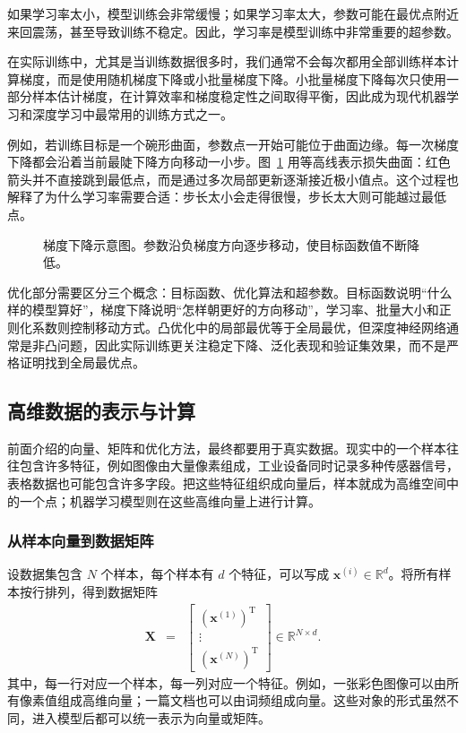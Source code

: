如果学习率太小，模型训练会非常缓慢；如果学习率太大，参数可能在最优点附近来回震荡，甚至导致训练不稳定。因此，学习率是模型训练中非常重要的超参数。

在实际训练中，尤其是当训练数据很多时，我们通常不会每次都用全部训练样本计算梯度，而是使用随机梯度下降或小批量梯度下降。小批量梯度下降每次只使用一部分样本估计梯度，在计算效率和梯度稳定性之间取得平衡，因此成为现代机器学习和深度学习中最常用的训练方式之一。

例如，若训练目标是一个碗形曲面，参数点一开始可能位于曲面边缘。每一次梯度下降都会沿着当前最陡下降方向移动一小步。图~\ref{fig:aml-gradient-descent} 用等高线表示损失曲面：红色箭头并不直接跳到最低点，而是通过多次局部更新逐渐接近极小值点。这个过程也解释了为什么学习率需要合适：步长太小会走得很慢，步长太大则可能越过最低点。

\begin{figure}[htbp]
  \centering
  
  \caption{梯度下降示意图。参数沿负梯度方向逐步移动，使目标函数值不断降低。}
  \label{fig:aml-gradient-descent}
\end{figure}

\begin{importantnote}
  优化部分需要区分三个概念：目标函数、优化算法和超参数。目标函数说明“什么样的模型算好”，梯度下降说明“怎样朝更好的方向移动”，学习率、批量大小和正则化系数则控制移动方式。凸优化中的局部最优等于全局最优，但深度神经网络通常是非凸问题，因此实际训练更关注稳定下降、泛化表现和验证集效果，而不是严格证明找到全局最优点。
\end{importantnote}

\subsection{高维数据的表示与计算}

前面介绍的向量、矩阵和优化方法，最终都要用于真实数据。现实中的一个样本往往包含许多特征，例如图像由大量像素组成，工业设备同时记录多种传感器信号，表格数据也可能包含许多字段。把这些特征组织成向量后，样本就成为高维空间中的一个点；机器学习模型则在这些高维向量上进行计算。

\subsubsection{从样本向量到数据矩阵}

设数据集包含 $N$ 个样本，每个样本有 $d$ 个特征，可以写成 $\mathbf{x}^{(i)}\in\mathbb{R}^{d}$。将所有样本按行排列，得到数据矩阵
\begin{eqnarray}
\mathbf{X}
& = &
\begin{bmatrix}
(\mathbf{x}^{(1)})^{\mathrm{T}}\\
\vdots\\
(\mathbf{x}^{(N)})^{\mathrm{T}}
\end{bmatrix}
\in\mathbb{R}^{N\times d}.
\end{eqnarray}
其中，每一行对应一个样本，每一列对应一个特征。例如，一张彩色图像可以由所有像素值组成高维向量；一篇文档也可以由词频组成向量。这些对象的形式虽然不同，进入模型后都可以统一表示为向量或矩阵。

